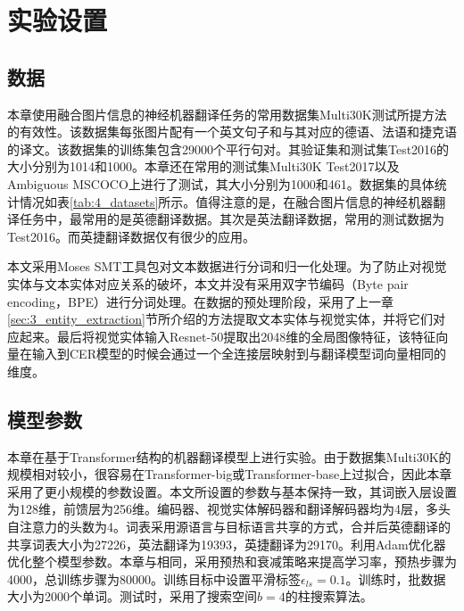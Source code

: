 \section{实验设置}
\label{sec:4_setup}

\subsection{数据}
\label{sec:4_dataset}


本章使用融合图片信息的神经机器翻译任务的常用数据集Multi30K测试所提方法的有效性。该数据集每张图片配有一个英文句子和与其对应的德语、法语和捷克语的译文。该数据集的训练集包含29000个平行句对。其验证集和测试集Test2016的大小分别为1014和1000。本章还在常用的测试集Multi30K Test2017以及Ambiguous MSCOCO上进行了测试，其大小分别为1000和461。数据集的具体统计情况如表\ref{tab:4_datasets}所示。值得注意的是，在融合图片信息的神经机器翻译任务中，最常用的是英德翻译数据。其次是英法翻译数据，常用的测试数据为Test2016。而英捷翻译数据仅有很少的应用。

本文采用Moses SMT工具包对文本数据进行分词和归一化处理。为了防止对视觉实体与文本实体对应关系的破坏，本文并没有采用双字节编码（Byte pair encoding，BPE）进行分词处理。在数据的预处理阶段，采用了上一章\ref{sec:3_entity_extraction}节所介绍的方法提取文本实体与视觉实体，并将它们对应起来。最后将视觉实体输入Resnet-50提取出2048维的全局图像特征，该特征向量在输入到CER模型的时候会通过一个全连接层映射到与翻译模型词向量相同的维度。

\subsection{模型参数}
\label{sec:4_model_setup}

本章在基于Transformer结构的机器翻译模型上进行实验。由于数据集Multi30K的规模相对较小，很容易在Transformer-big或Transformer-base上过拟合，因此本章采用了更小规模的参数设置。本文所设置的参数与基本保持一致，其词嵌入层设置为128维，前馈层为256维。编码器、视觉实体解码器和翻译解码器均为4层，多头自注意力的头数为4。词表采用源语言与目标语言共享的方式，合并后英德翻译的共享词表大小为27226，英法翻译为19393，英捷翻译为29170。利用Adam优化器优化整个模型参数。本章与相同，采用预热和衰减策略来提高学习率，预热步骤为4000，总训练步骤为80000。训练目标中设置平滑标签$\epsilon_{ls}=0.1$。训练时，批数据大小为2000个单词。测试时，采用了搜索空间$b=4$的柱搜索算法。

